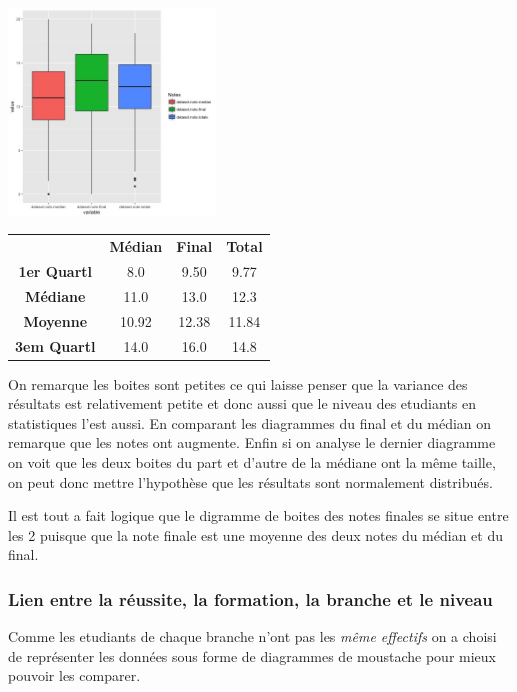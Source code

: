 \documentclass[10pt]{article}
\begin{document}
\begin{minipage}{.4\textwidth}	
	\includegraphics[width=55mm]{Figures/Notes/boxplot_exam.jpg}
	\label{fig:Boxplot_notes}
\end{minipage}%
\hspace{0.03\linewidth}
\begin{minipage}{.6\textwidth}
	\begin{tabular}{ c c c c }
		\textbf{}       & \textbf{Médian} & \textbf{Final}   & \textbf{Total} \\
		\textbf{1er Quartl}    & 8.0 			       & 9.50		      & 9.77    \\
		\textbf{Médiane  }   &11.0		             & 13.0	            & 12.3    \\
		\textbf{Moyenne}     & 10.92                &  12.38          & 11.84\\
		\textbf{3em Quartl}  & 14.0  				& 16.0 		       & 14.8\\
	\end{tabular}
\end{minipage}


On remarque les boites sont petites ce qui laisse penser que la variance des résultats est relativement petite et donc aussi que le niveau des etudiants en statistiques l'est aussi.  En comparant les diagrammes du final et du médian on remarque que les notes ont augmente.  Enfin si on analyse le dernier diagramme on voit que les deux boites du part et d'autre de la médiane ont la même taille, on peut donc mettre l'hypothèse que les résultats sont normalement distribués. 

Il est tout a fait logique que le digramme de boites des notes finales se situe entre les 2 puisque que la note finale est une moyenne des deux notes du médian et du final.
 
	
\subsubsection{Lien entre la réussite, la formation, la branche et le niveau}
Comme les etudiants de chaque branche n'ont pas les \textit{même effectifs} on a choisi de représenter les données sous forme de diagrammes de moustache pour mieux pouvoir les comparer.\\
\end{document}
